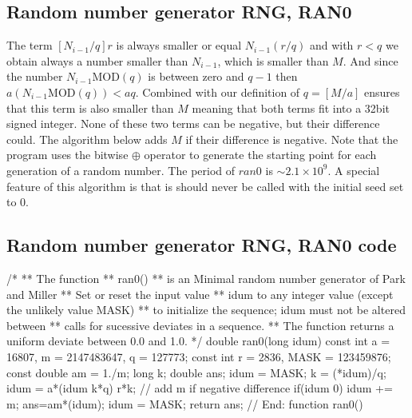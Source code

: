 \documentclass[letterpaper,10pt,english]{sphinxmanual}
\begin{document}
\subsection{Random number generator RNG, RAN0}
\label{\detokenize{chapter2:id12}}
The term \([N_{i-1}/q]r\) is always smaller or equal \(N_{i-1}(r/q)\) and with \(r < q\) we obtain always a
number smaller than \(N_{i-1}\), which is smaller than \(M\).
And since the number \(N_{i-1}\mathrm{MOD} (q)\) is between zero and \(q-1\) then
\(a(N_{i-1}\mathrm{MOD} (q))< aq\). Combined with our definition of \(q=[M/a]\) ensures that
this term is also smaller than \(M\) meaning that both terms fit into a
32\sphinxhyphen{}bit signed integer. None of these two terms can be negative, but their difference could.
The algorithm below adds \(M\) if their difference is negative.
Note that the program uses the bitwise \(\oplus\) operator to generate
the starting point for each generation of a random number. The period
of \(ran0\) is \(\sim 2.1\times 10^{9}\). A special feature of this
algorithm is that is should never be called with the initial seed
set to \(0\).


\subsection{Random number generator RNG, RAN0 code}
\label{\detokenize{chapter2:random-number-generator-rng-ran0-code}}
\begin{sphinxVerbatim}[commandchars=\\\{\}]
        /*
         ** The function
         **           ran0()
         ** is an \PYGZdq{}Minimal\PYGZdq{} random number generator of Park and Miller
         ** Set or reset the input value
         ** idum to any integer value (except the unlikely value MASK)
         ** to initialize the sequence; idum must not be altered between
         ** calls for sucessive deviates in a sequence.
         ** The function returns a uniform deviate between 0.0 and 1.0.
         */
    double ran0(long \PYGZam{}idum)
    \PYGZob{}
       const int a = 16807, m = 2147483647, q = 127773;
       const int r = 2836, MASK = 123459876;
       const double am = 1./m;
       long     k;
       double   ans;
       idum \PYGZca{}= MASK;
       k = (*idum)/q;
       idum = a*(idum \PYGZhy{} k*q) \PYGZhy{} r*k;
       // add m if negative difference
       if(idum \PYGZlt{} 0) idum += m;
       ans=am*(idum);
       idum \PYGZca{}= MASK;
       return ans;
    \PYGZcb{} // End: function ran0() 
\end{sphinxVerbatim}
\end{document}
